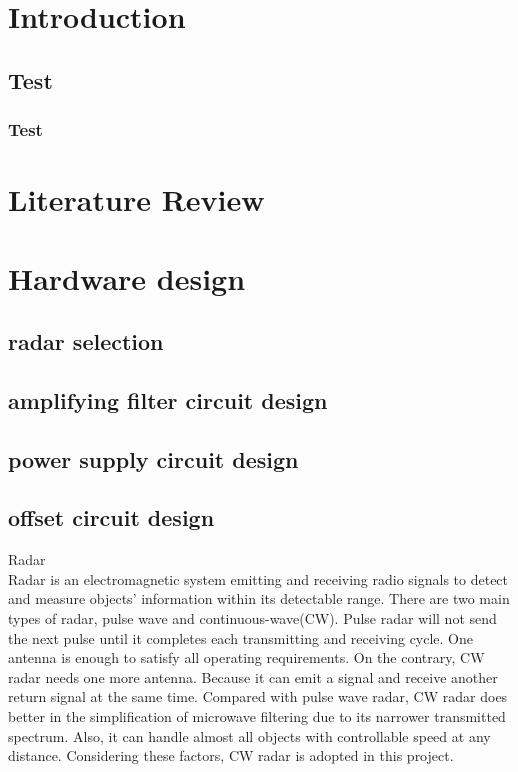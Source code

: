 \thispagestyle{empty}
\newpage

\tableofcontents{\protect\thispagestyle{empty}}
\pagestyle{fancy}
\clearpage
\setcounter{page}{1}
\newpage



\section{Introduction}


\subsection{Test}
\subsubsection{Test}



\section{Literature Review}


\section{Hardware design}


\subsection{radar selection}
\subsection{amplifying filter circuit design}
\subsection{power supply circuit design}
\subsection{offset circuit design}

\newpage
Radar\\
Radar is an electromagnetic system emitting and receiving radio signals to detect and measure objects’ information within its detectable range. There are two main types of radar, pulse wave and continuous-wave(CW). Pulse radar will not send the next pulse until it completes each transmitting and receiving cycle. One antenna is enough to satisfy all operating requirements. On the contrary, CW radar needs one more antenna. Because it can emit a signal and receive another return signal at the same time. Compared with pulse wave radar, CW radar does better in the simplification of microwave filtering due to its narrower transmitted spectrum. Also, it can handle almost all objects with controllable speed at any distance. Considering these factors, CW radar is adopted in this project. 

